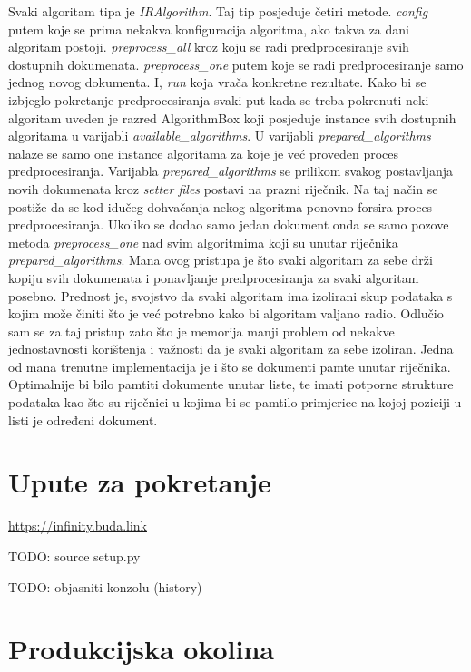 \documentclass[a4paper,11pt]{article}
\begin{document}
Svaki algoritam tipa je \textit{IRAlgorithm}. Taj tip posjeduje četiri metode. \textit{config} putem koje se prima nekakva konfiguracija algoritma, ako takva za dani algoritam postoji. \textit{preprocess\_all} kroz koju se radi predprocesiranje svih dostupnih dokumenata. \textit{preprocess\_one} putem koje se radi predprocesiranje samo jednog novog dokumenta. I, \textit{run} koja vrača konkretne rezultate. Kako bi se izbjeglo pokretanje predprocesiranja svaki put kada se treba pokrenuti neki algoritam uveden je razred AlgorithmBox koji posjeduje instance svih dostupnih algoritama u varijabli \textit{available\_algorithms}. U varijabli \textit{prepared\_algorithms} nalaze se samo one instance algoritama za koje je već proveden proces predprocesiranja. Varijabla \textit{prepared\_algorithms} se prilikom svakog postavljanja novih dokumenata kroz \textit{setter files} postavi na prazni riječnik. Na taj način se postiže da se kod idučeg dohvačanja nekog algoritma ponovno forsira proces predprocesiranja. Ukoliko se dodao samo jedan dokument onda se samo pozove metoda \textit{preprocess\_one} nad svim algoritmima koji su unutar riječnika \textit{prepared\_algorithms}. Mana ovog pristupa je što svaki algoritam za sebe drži kopiju svih dokumenata i ponavljanje predprocesiranja za svaki algoritam posebno. Prednost je, svojstvo da svaki algoritam ima izolirani skup podataka s kojim može činiti što je već potrebno kako bi algoritam valjano radio. Odlučio sam se za taj pristup zato što je memorija manji problem od nekakve jednostavnosti korištenja i važnosti da je svaki algoritam za sebe izoliran. Jedna od mana trenutne implementacija je i što se dokumenti pamte unutar riječnika. Optimalnije bi bilo pamtiti dokumente unutar liste, te imati potporne strukture podataka kao što su riječnici u kojima bi se pamtilo primjerice na kojoj poziciji u listi je određeni dokument.

\section{Upute za pokretanje}

\url{https://infinity.buda.link}

TODO: source setup.py

TODO: objasniti konzolu (history)

\section{Produkcijska okolina}
\end{document}
